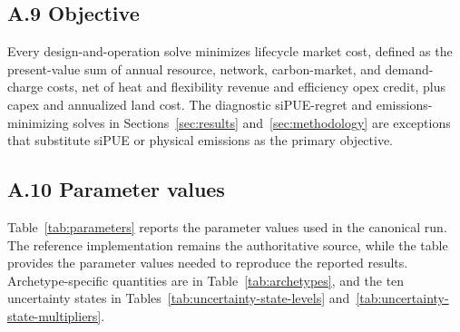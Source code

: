 \documentclass[preprint,12pt]{elsarticle}
\begin{document}
\subsection*{A.9 Objective}
Every design-and-operation solve minimizes lifecycle market cost, defined as the present-value sum of annual resource, network, carbon-market, and demand-charge costs, net of heat and flexibility revenue and efficiency opex credit, plus capex and annualized land cost. The diagnostic siPUE-regret and emissions-minimizing solves in Sections~\ref{sec:results} and~\ref{sec:methodology} are exceptions that substitute siPUE or physical emissions as the primary objective.

\subsection*{A.10 Parameter values}
\label{app:parameters}

Table~\ref{tab:parameters} reports the parameter values used in the canonical run. The reference implementation remains the authoritative source, while the table provides the parameter values needed to reproduce the reported results. Archetype-specific quantities are in Table~\ref{tab:archetypes}, and the ten uncertainty states in Tables~\ref{tab:uncertainty-state-levels} and~\ref{tab:uncertainty-state-multipliers}.
\end{document}
